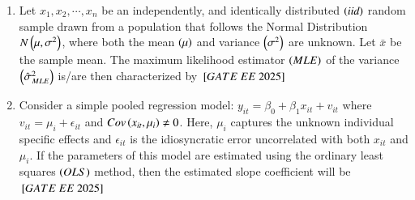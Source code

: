 \documentclass[journal,12pt,onecolumn]{IEEEtran}
\theoremstyle{remark}
\begin{document}
\begin{enumerate}
    \item Let $x_1, x_2, \cdots, x_n$ be an independently, and identically distributed  $\left(\textit{iid}\right)$ random sample drawn from a population that follows the Normal Distribution $N \left(\mu, \sigma^2\right)$, where both the mean $\left(\mu\right)$ and variance $ \left(\sigma^2\right)$ are unknown. Let $\bar{x}$ be the sample mean. The maximum likelihood estimator  $\left(MLE\right)$ of the variance $\left(\hat{\sigma}^2_{MLE}\right)$ is/are then characterized by
    \hfill $\sbrak{GATE\ EE\ 2025}$
    \begin{enumerate}
       \end{enumerate}
 
\item Consider a simple pooled regression model: $y_{it} = \beta_0 + \beta_1 x_{it} + v_{it}$ where $v_{it} = \mu_i + \epsilon_{it}$ and $Cov \left(x_{it},\mu_{i}\right) \neq 0$. Here, $\mu_{i}$ captures the unknown individual specific effects and $\epsilon_{it}$ is the idiosyncratic error uncorrelated with both $x_{it}$ and $\mu_{i}$. If the parameters of this model are estimated using the ordinary least squares  $\left(OLS\right)$ method, then the estimated slope coefficient will be
\hfill $\sbrak{GATE\ EE\ 2025}$
    \begin{enumerate}
      \end{enumerate}
 

\end{enumerate}
\end{document}
